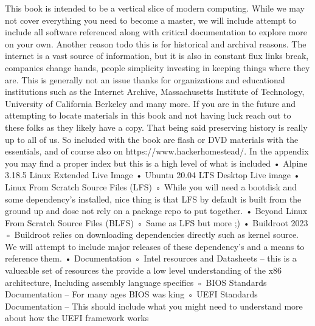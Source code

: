 This book is intended to be a vertical slice of modern computing. While we may not cover everything you need to become a master, we will include attempt to include all software referenced along with critical documentation to explore more on your own. Another reason todo this is for historical and archival reasons.  The internet is a vast source of information, but it is also in constant flux links break, companies change hands, people simplicity investing in keeping things where they are. This is generally not an issue thanks for organizations and educational institutions such as the Internet Archive, Massachusetts Institute of Technology, University of California Berkeley and many more. If you are in the future and attempting to locate materials in this book and not having luck reach out to these folks as they likely have a copy. That being said preserving history is really up to all of us. So included with the book are flash or DVD materials with the essentials, and of course also on https://www.hackerhomestead/.
In the appendix you may find a proper index but this is a high level of what is included
    • Alpine  3.18.5 Linux Extended Live Image
    • Ubuntu 20.04 LTS Desktop Live image
    • Linux From Scratch Source Files (LFS)
        ◦ While you will need a bootdisk and some dependency's installed, nice thing is that LFS by default is built from the ground up and dose not rely on a package repo to put together. 
    • Beyond Linux From Scratch Source Files (BLFS)
        ◦ Same as LFS but more ;) 
    • Buildroot 2023
        ◦ Buildroot relies on downloading dependencies directly such as kernel source. We will attempt to include major releases of these dependency's and a means to reference them.
    • Documentation
        ◦ Intel resources and Datasheets – this is a valueable set of resources the provide a low level understanding of the x86 architecture, Including assembly language specifics
        ◦ BIOS Standards Documentation – For many ages BIOS was king
        ◦ UEFI Standards Documentation – This should include what you might need to understand more about how the UEFI framework works
